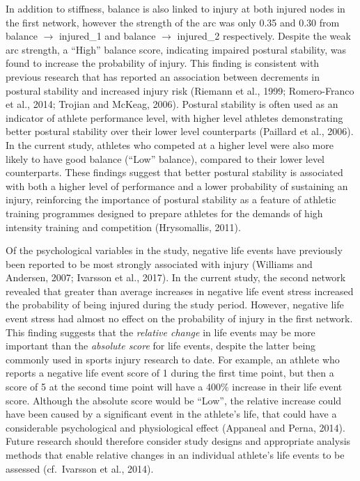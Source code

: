 \documentclass[
  english,
  man]{apa6}
\begin{document}
In addition to stiffness, balance is also linked to injury at both injured nodes in the first network, however the strength of the arc was only 0.35 and 0.30 from balance \(\rightarrow\) injured\_1 and balance \(\rightarrow\) injured\_2 respectively.
Despite the weak arc strength, a ``High'' balance score, indicating impaired postural stability, was found to increase the probability of injury.
This finding is consistent with previous research that has reported an association between decrements in postural stability and increased injury risk (Riemann et al., 1999; Romero-Franco et al., 2014; Trojian and McKeag, 2006).
Postural stability is often used as an indicator of athlete performance level, with higher level athletes demonstrating better postural stability over their lower level counterparts (Paillard et al., 2006).
In the current study, athletes who competed at a higher level were also more likely to have good balance (``Low'' balance), compared to their lower level counterparts.
These findings suggest that better postural stability is associated with both a higher level of performance and a lower probability of sustaining an injury, reinforcing the importance of postural stability as a feature of athletic training programmes designed to prepare athletes for the demands of high intensity training and competition (Hrysomallis, 2011).

Of the psychological variables in the study, negative life events have previously been reported to be most strongly associated with injury (Williams and Andersen, 2007; Ivarsson et al., 2017).
In the current study, the second network revealed that greater than average increases in negative life event stress increased the probability of being injured during the study period.
However, negative life event stress had almost no effect on the probability of injury in the first network.
This finding suggests that the \emph{relative change} in life events may be more important than the \emph{absolute score} for life events, despite the latter being commonly used in sports injury research to date.
For example, an athlete who reports a negative life event score of 1 during the first time point, but then a score of 5 at the second time point will have a 400\% increase in their life event score.
Although the absolute score would be ``Low'', the relative increase could have been caused by a significant event in the athlete's life, that could have a considerable psychological and physiological effect (Appaneal and Perna, 2014).
Future research should therefore consider study designs and appropriate analysis methods that enable relative changes in an individual athlete's life events to be assessed (cf.~Ivarsson et al., 2014).
\end{document}
